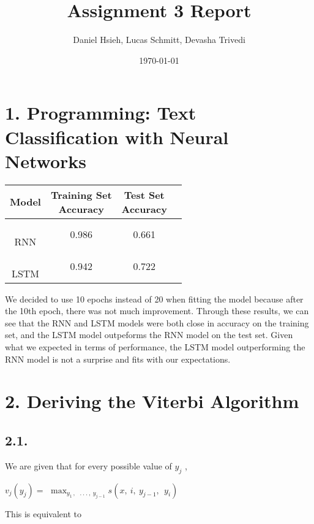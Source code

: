 \documentclass[10pt]{article}
\title{\textbf{Assignment 3 Report}}
\author{Daniel Hsieh, Lucas Schmitt, Devasha Trivedi}
\date{\today}
\begin{document}
\maketitle

\section*{1. Programming: Text Classification with Neural Networks}

\begin{center}
    \begin{tabular}{ c|c|c|c} 
     Model & \shortstack{Training Set \\ Accuracy } & \shortstack{Test Set \\ Accuracy } & \\ \hline 
     \shortstack{\\ RNN} & 0.986 & 0.661 & \\ \hline
     \shortstack{\\ LSTM} & 0.942 & 0.722 &  \\ \hline
    \end{tabular}
\end{center}

\noindent We decided to use 10 epochs instead of 20 when fitting the model because after the 10th epoch, there was not much improvement. 
Through these results, we can see that the RNN and LSTM models were both close in accuracy on the training set, and the LSTM model 
outpeforms the RNN model on the test set. Given what we expected in terms of performance, the LSTM model outperforming the RNN model is not a surprise 
and fits with our expectations.

\section*{2. Deriving the Viterbi Algorithm}

\subsection*{2.1.}

\noindent We are given that for every possible value of \(y_{j}\) ,

\begin{center}
\(v_{j}(y_{j}) =\)
\(\max_{y_{1\ },\ \ \ .\ .\ .\ ,\ y_{j - 1}}s(x,\ i,\ y_{j - 1},\ \ y_{i})\ \)
\end{center}

\noindent This is equivalent to
\end{document}
